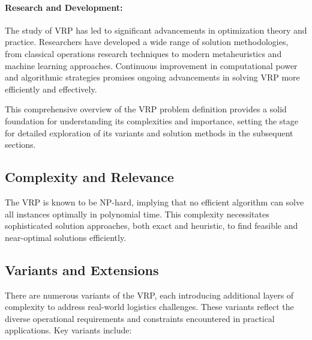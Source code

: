 \documentclass{article}
\begin{document}
    \paragraph{Research and Development:}
    The study of VRP has led to significant advancements in optimization theory and practice. Researchers have developed a wide range of solution methodologies, from classical operations research techniques to modern metaheuristics and machine learning approaches. Continuous improvement in computational power and algorithmic strategies promises ongoing advancements in solving VRP more efficiently and effectively.

    This comprehensive overview of the VRP problem definition provides a solid foundation for understanding its complexities and importance, setting the stage for detailed exploration of its variants and solution methods in the subsequent sections.
    \cite{konstantakopoulos2022vehicle}

    \subsection{Complexity and Relevance}\label{subsec:complexity-and-relevance}
    The VRP is known to be NP-hard, implying that no efficient algorithm can solve all instances optimally in polynomial time. This complexity necessitates sophisticated solution approaches, both exact and heuristic, to find feasible and near-optimal solutions efficiently.
    \cite{konstantakopoulos2022vehicle}

    \subsection{Variants and Extensions}\label{subsec:variants-and-extensions}
    There are numerous variants of the VRP, each introducing additional layers of complexity to address real-world logistics challenges. These variants reflect the diverse operational requirements and constraints encountered in practical applications. Key variants include:
\end{document}
